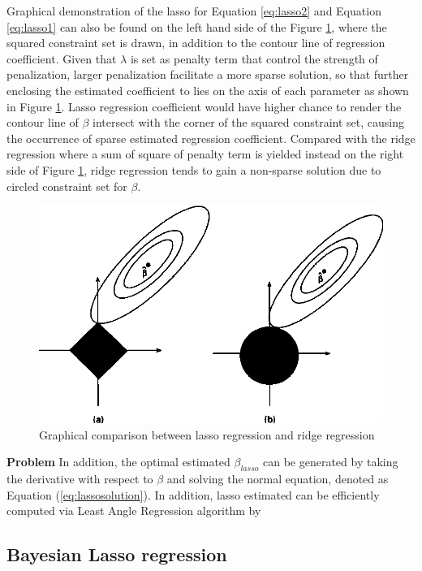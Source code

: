 Graphical demonstration of the lasso for Equation \ref{eq:lasso2} and Equation \ref{eq:lasso1} can also be found on the left hand side of the Figure \ref{fig:lassodemo}, where the squared constraint set is drawn, in addition to the contour line of regression coefficient. Given that $\lambda$ is set as penalty term that control the strength of penalization, larger penalization facilitate a more sparse solution, so that further enclosing the estimated coefficient to lies on the axis of each parameter as shown in Figure \ref{fig:lassodemo}. Lasso regression coefficient would have higher chance to render the contour line of $\beta$ intersect with the corner of the squared constraint set, causing the occurrence of sparse estimated regression coefficient. Compared with the ridge regression where a sum of square of penalty term is yielded instead on the right side of Figure \ref{fig:lassodemo}, ridge regression tends to gain a non-sparse solution due to circled constraint set for $\beta$.

\begin{figure}
	\includegraphics[width=\linewidth]{lassodemo}
	\caption{Graphical comparison between lasso regression and ridge regression}
	\label{fig:lassodemo}
\end{figure}

\textbf{Problem}
In addition, the optimal estimated $\beta_{lasso}$ can be generated by taking the derivative with respect to $\beta$ and solving the normal equation, denoted as Equation (\ref{eq:lassosolution}).
In addition, lasso estimated can be efficiently computed via Least Angle Regression algorithm by

\subsection{Bayesian Lasso regression}


